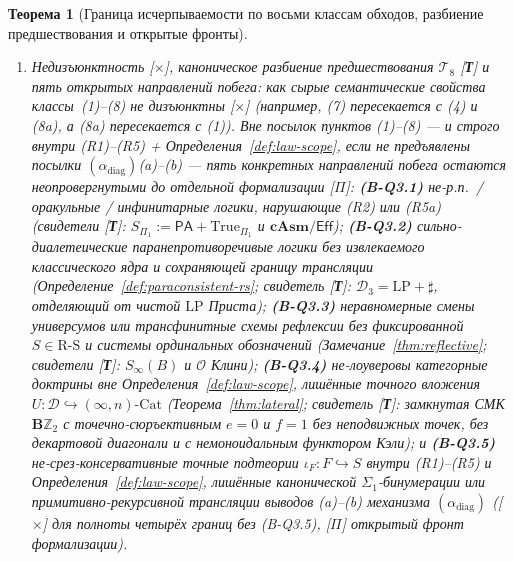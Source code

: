 \documentclass[11pt]{article}
\theoremstyle{plain}
\newtheorem{theorem}{Теорема}[section]
\theoremstyle{definition}
\newcommand{\RS}{\mathrm{R\text{-}S}}
\newcommand{\Cat}{\mathrm{Cat}}
\newcommand{\PA}{\mathsf{PA}}
\newcommand{\Eff}{\ensuremath{\mathsf{Eff}}}
\begin{document}
\begin{theorem}[Граница исчерпываемости по восьми классам обходов, разбиение предшествования и открытые фронты]
\begin{enumerate}[nosep,label=(\roman*)]
\begin{enumerate}[nosep,label=(\arabic*)]
  \item \emph{Неклассическая / паранепротиворечивая / актовая граница}: интуиционистские, линейные с \texttt{!} и реализуемостные р.п.\ системы в $\RS$, допускающие негативную трансляцию, блокируются Теоремами~\ref{thm:afnt-alpha}~(ii) и~\ref{thm:dual-afnt}~(ii) \textup{[\textbf{С}]} (при $(\alpha_{\mathrm{diag}})$(a)--(b)), тогда как паранепротиворечивые системы с извлекаемым классическим ядром $S^* \in \RS$ и сохраняющей границу трансляцией блокируются Теоремой~\ref{thm:paraconsistent-afnt} \textup{[\textbf{С}]}.
  \end{enumerate}
\item \emph{Недизъюнктность \textup{[\textbf{$\times$}]}, каноническое разбиение предшествования $\mathcal{T}_8$ \textup{[\textbf{Т}]} и пять открытых направлений побега}: как сырые семантические свойства классы~(1)--(8) \emph{не} дизъюнктны \textup{[\textbf{$\times$}]} (например, (7) пересекается с (4) и (8a), а (8a) пересекается с (1)). Вне посылок пунктов (1)--(8) --- и строго внутри (R1)--(R5) + Определения~\ref{def:law-scope}, если не предъявлены посылки $(\alpha_{\mathrm{diag}})$(a)--(b) --- \emph{пять} конкретных направлений побега остаются неопровергнутыми до отдельной формализации \textup{[\textbf{$\Pi$}]}:
  \textbf{(B-Q3.1)} не-р.п.\ / оракульные / инфинитарные логики, нарушающие (R2) или (R5a) (свидетели \textup{[\textbf{Т}]}: $S_{\Pi_1} := \PA + \mathrm{True}_{\Pi_1}$ и $\mathbf{cAsm}/\Eff$);
  \textbf{(B-Q3.2)} сильно-диалетеические паранепротиворечивые логики без извлекаемого классического ядра и сохраняющей границу трансляции (Определение~\ref{def:paraconsistent-rs}; свидетель \textup{[\textbf{Т}]}: $\mathcal{D}_3 = \mathrm{LP} + \sharp$, отделяющий от чистой $\mathrm{LP}$ Приста);
  \textbf{(B-Q3.3)} неравномерные смены универсумов или трансфинитные схемы рефлексии без фиксированной $S \in \RS$ и системы ординальных обозначений (Замечание~\ref{thm:reflective}; свидетели \textup{[\textbf{Т}]}: $S_\infty(B)$ и $\mathcal{O}$ Клини);
  \textbf{(B-Q3.4)} не-лоуверовы категорные доктрины вне Определения~\ref{def:law-scope}, лишённые точного вложения $U : \mathcal{D} \hookrightarrow (\infty, n)\text{-}\Cat$ (Теорема~\ref{thm:lateral}; свидетель \textup{[\textbf{Т}]}: замкнутая СМК $\mathbf{B}\mathbb{Z}_2$ с точечно-сюръективным $e = 0$ и $f = 1$ без неподвижных точек, без декартовой диагонали и с немоноидальным функтором Кэли); и
  \textbf{(B-Q3.5)} не-срез-консервативные точные подтеории $\iota_F : F \hookrightarrow S$ внутри (R1)--(R5) и Определения~\ref{def:law-scope}, лишённые канонической $\Sigma_1$-бинумерации или примитивно-рекурсивной трансляции выводов (a)--(b) механизма $(\alpha_{\mathrm{diag}})$ (\textup{[\textbf{$\times$}]} для полноты четырёх границ без (B-Q3.5), \textup{[\textbf{$\Pi$}]} открытый фронт формализации).

\end{enumerate}
\end{theorem}
\end{document}
